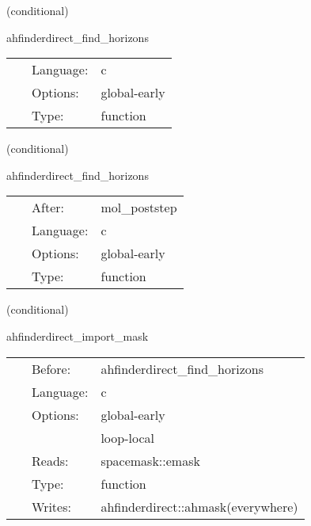    (conditional) 

\hspace{5mm} ahfinderdirect\_find\_horizons 

\hspace{5mm}{\it find apparent horizon(s) after this time step } 


\hspace{5mm}

 \begin{tabular*}{160mm}{cll} 
~ & Language:  & c \\ 
~ & Options:  & global-early \\ 
~ & Type:  & function \\ 
\end{tabular*} 


\vspace{5mm}

   (conditional) 

\hspace{5mm} ahfinderdirect\_find\_horizons 

\hspace{5mm}{\it find apparent horizon(s) after this time step } 


\hspace{5mm}

 \begin{tabular*}{160mm}{cll} 
~ & After:  & mol\_poststep \\ 
~ & Language:  & c \\ 
~ & Options:  & global-early \\ 
~ & Type:  & function \\ 
\end{tabular*} 


\vspace{5mm}

   (conditional) 

\hspace{5mm} ahfinderdirect\_import\_mask 

\hspace{5mm}{\it import the excision mask } 


\hspace{5mm}

 \begin{tabular*}{160mm}{cll} 
~ & Before:  & ahfinderdirect\_find\_horizons \\ 
~ & Language:  & c \\ 
~ & Options:  & global-early \\ 
~& ~ &loop-local\\ 
~ & Reads:  & spacemask::emask \\ 
~ & Type:  & function \\ 
~ & Writes:  & ahfinderdirect::ahmask(everywhere) \\ 
\end{tabular*} 


